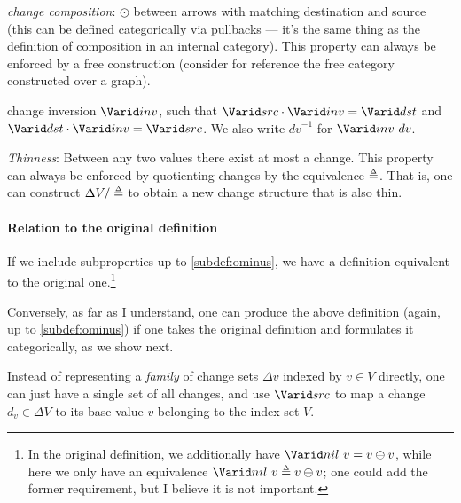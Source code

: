 \begin{definition}
\begin{subdefinition}[resume]
\item \label{subdef:composition} \emph{change composition}:
  $\odot$ between arrows with matching destination and
  source (this can be defined categorically via pullbacks --- it's the same
  thing as the definition of composition in an internal category). This property
  can always be enforced by a free construction (consider for reference the free
  category constructed over a graph).
\item \label{subdef:groupoid} change inversion $\Term{inv}$, such that
  $\Term{src} \cdot \Term{inv} = \Term{dst}$ and
  $\Term{dst} \cdot \Term{inv} = \Term{src}$. We also write ${dv}^{-1}$ for
  $\Term{inv}\ dv$.
\item \label{subdef:thin} \emph{Thinness}: Between any two values there exist at
  most a change. This property can always be enforced by quotienting changes by
  the equivalence $\Doe$. That is, one can construct $\Delta V / \Doe$ to
  obtain a new change structure that is also thin.
\end{subdefinition}
\end{definition}

\paragraph{Relation to the original definition}
If we include subproperties up to \cref{subdef:ominus}, we have a definition
equivalent to the original one.\footnote{In the original definition, we
  additionally have $\Term{nil}\ v = v \ominus v$, while here we only have an
  equivalence $\Term{nil}\ v \Doe v \ominus v$; one could add the former requirement,
  but I believe it is not important.}

Conversely, as far as I understand, one can produce the above definition (again,
up to \cref{subdef:ominus}) if one takes the original definition and
formulates it categorically, as we show next.

Instead of representing a \emph{family} of change sets $\Delta v$ indexed by
$v \in V$ directly, one can just have a single set of all changes, and use
$\Term{src}$ to map a change $d_v \in \Delta V$ to its base value $v$ belonging
to the index set $V$.

